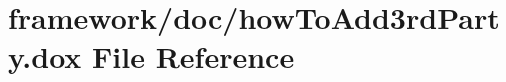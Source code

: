 \hypertarget{how_to_add3rd_party_8dox}{}\section{framework/doc/how\+To\+Add3rd\+Party.dox File Reference}
\label{how_to_add3rd_party_8dox}
